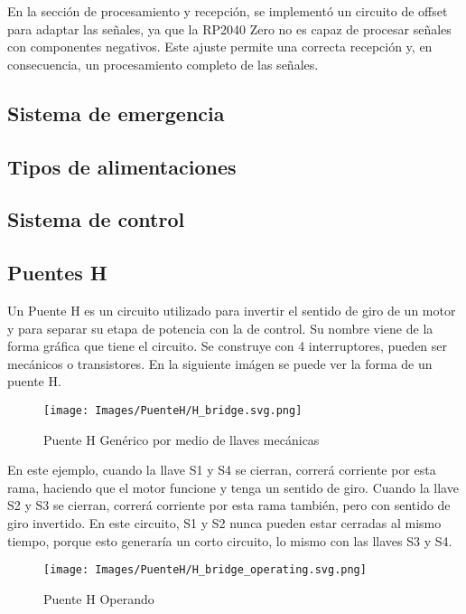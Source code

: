 \documentclass{article}
\begin{document}
En la sección de procesamiento y recepción, se implementó un circuito de offset para adaptar las señales, ya que la RP2040 Zero no es capaz de procesar señales con componentes negativos. Este ajuste permite una correcta recepción y, en consecuencia, un procesamiento completo de las señales.



\subsection{Sistema de emergencia}

\subsection{Tipos de alimentaciones}

\subsection{Sistema de control}

\subsection{Puentes H}
Un Puente H es un circuito utilizado para invertir el sentido de giro de un motor y para separar su etapa de potencia con la de control. Su nombre viene de la forma gráfica que tiene el circuito. Se construye con 4 interruptores, pueden ser mecánicos o transistores. En la siguiente imágen se puede ver la forma de un puente H.

\begin{figure}[H]
    \centering
    \texttt{[image: Images/PuenteH/H\_bridge.svg.png]}
    \caption{Puente H Genérico por medio de llaves mecánicas}
\end{figure}

En este ejemplo, cuando la llave S1 y S4 se cierran, correrá corriente por esta rama, haciendo que el motor funcione y tenga un sentido de giro. Cuando la llave S2 y S3 se cierran, correrá corriente por esta rama también, pero con sentido de giro invertido. En este circuito, S1 y S2 nunca pueden estar cerradas al mismo tiempo, porque esto generaría un corto circuito, lo mismo con las llaves S3 y S4.

\begin{figure}[H]
    \centering
    \texttt{[image: Images/PuenteH/H\_bridge\_operating.svg.png]}
    \caption{Puente H Operando}
\end{figure}
\end{document}

